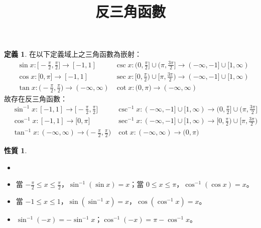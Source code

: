 \documentclass[12pt]{extarticle}
\newcommand{\ds}{\displaystyle}
\theoremstyle{definition}
\newtheorem*{dfn}{定義}
\newtheorem*{prp}{性質}
\begin{document}
\title{\texorpdfstring{\vspace{-16mm} 反三角函數}{反三角函數}} 
\author{\vspace{-5em}}
\date{\vspace{-5em}}
\maketitle

\vspace{1em}
\begin{dfn}
  在以下定義域上之三角函數為嵌射：
  \begin{align*}
    &\sin x: \big[-\frac{\pi}{2}, \frac{\pi}{2}\big]\to[-1, 1] &\csc x: \big(0, \frac{\pi}{2}\big]\cup\big(\pi, \frac{3\pi}{2}\big]\to(-\infty, -1]\cup[1,\infty) \\
    &\cos x: \big[0, \pi\big]\to[-1, 1] &\sec x: \big[0, \frac{\pi}{2}\big)\cup\big[\pi, \frac{3\pi}{2}\big)\to(-\infty, -1]\cup[1,\infty) \\
    &\tan x: \big(-\frac{\pi}{2}, \frac{\pi}{2}\big)\to(-\infty, \infty) &\cot x: \big(0, \pi\big)\to(-\infty, \infty)\qquad\qquad
  \end{align*}
  故存在反三角函數：
  \begin{align*}
   &\sin^{-1} x: [-1, 1]\to\big[-\frac{\pi}{2}, \frac{\pi}{2}\big] &\csc^{-1} x: (-\infty, -1]\cup[1,\infty)\to\big(0, \frac{\pi}{2}\big]\cup\big(\pi, \frac{3\pi}{2}\big] \\
   &\cos^{-1} x: [-1, 1]\to\big[0, \pi\big] &\sec^{-1} x: (-\infty, -1]\cup[1,\infty)\to\big[0, \frac{\pi}{2}\big)\cup\big[\pi, \frac{3\pi}{2}\big) \\
   &\tan^{-1} x: (-\infty, \infty)\to\big(-\frac{\pi}{2}, \frac{\pi}{2}\big) &\cot x: (-\infty, \infty)\to\big(0, \pi\big)\qquad\qquad
 \end{align*}
\end{dfn}

\begin{prp}
  \begin{itemize}
    \item[]
    \item 當 $\ds-\frac{\pi}{2}\leqslant x\leqslant\frac{\pi}{2}$，$\sin^{-1}(\sin x) = x$；當 $\ds 0\leqslant x\leqslant\pi$，$\cos^{-1}(\cos x) = x$。
    \item 當 $\ds-1\leqslant x\leqslant1$，$\sin(\sin^{-1} x) = x$，$\cos(\cos^{-1} x) = x$。
    \item $\sin^{-1}(-x) = -\sin^{-1}x$；$\cos^{-1}(-x) = \pi - \cos^{-1}x$。
  \end{itemize}
\end{prp}
\end{document}
